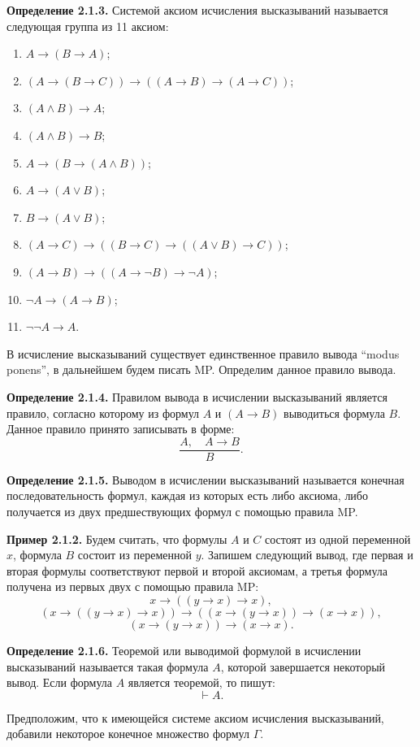 \documentclass[12pt,letterpaper]{article}
\begin{document}
\textbf{Определение 2.1.3.} Системой аксиом исчисления высказываний называется следующая группа из 11 аксиом:
\begin{enumerate}
    \item $A \to (B \to A)$;
    \item $(A \to (B \to C)) \to ((A \to B) \to (A \to C))$;
    \item $(A \land B) \to A$;
    \item $(A \land B) \to B$;
    \item $A \to (B \to (A \land B))$;
    \item $A \to (A \lor B)$;
    \item $B \to (A \lor B)$;
    \item $(A \to C) \to ((B \to C) \to ((A \lor B) \to C))$;
    \item $(A \to B) \to ((A \to \neg B) \to \neg A)$;
    \item $\neg A \to (A \to B)$;
    \item $\neg\neg A \to A$.
\end{enumerate}

В исчисление высказываний существует единственное правило вывода ``modus ponens'', в дальнейшем будем писать MP. Определим данное правило вывода.

\textbf{Определение 2.1.4.} Правилом вывода в исчислении высказываний является правило, согласно которому из формул $A$ и $(A \to B)$ выводиться формула $B$. Данное правило принято записывать в форме:
\[
\frac{A,\quad A\to B}{B}.
\]

\textbf{Определение 2.1.5.} Выводом в исчислении высказываний называется конечная последовательность формул, каждая из которых есть либо аксиома, либо получается из двух предшествующих формул с помощью правила MP.

\textbf{Пример 2.1.2.} Будем считать, что формулы $A$ и $C$ состоят из одной переменной $x$, формула $B$ состоит из переменной $y$. Запишем следующий вывод, где первая и вторая формулы соответствуют первой и второй аксиомам, а третья формула получена из первых двух с помощью правила MP:
\[
x \to ((y \to x) \to x),
\]
\[
(x \to ((y \to x) \to x)) \to ((x \to (y \to x)) \to (x \to x)),
\]
\[
(x \to (y \to x)) \to (x \to x).
\]

\textbf{Определение 2.1.6.} Теоремой или выводимой формулой в исчислении высказываний называется такая формула $A$, которой завершается некоторый вывод. Если формула $A$ является теоремой, то пишут:
\[
\vdash A.
\]

Предположим, что к имеющейся системе аксиом исчисления высказываний, добавили некоторое конечное множество формул $\Gamma$.
\end{document}
